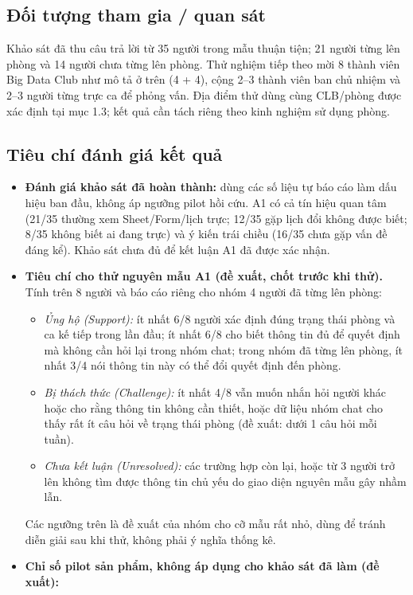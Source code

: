 \subsection{Đối tượng tham gia / quan sát}
Khảo sát đã thu câu trả lời từ 35 người trong mẫu thuận tiện; 21 người từng lên phòng và 14 người chưa từng lên phòng. Thử nghiệm tiếp theo mời 8 thành viên Big Data Club như mô tả ở trên (4 + 4), cộng 2--3 thành viên ban chủ nhiệm và 2--3 người từng trực ca để phỏng vấn. Địa điểm thử dùng cùng CLB/phòng được xác định tại mục 1.3; kết quả cần tách riêng theo kinh nghiệm sử dụng phòng.

\subsection{Tiêu chí đánh giá kết quả}
\begin{itemize}
    \item \textbf{Đánh giá khảo sát đã hoàn thành:} dùng các số liệu tự báo cáo làm dấu hiệu ban đầu, không áp ngưỡng pilot hồi cứu. A1 có cả tín hiệu quan tâm (21/35 thường xem Sheet/Form/lịch trực; 12/35 gặp lịch đổi không được biết; 8/35 không biết ai đang trực) và ý kiến trái chiều (16/35 chưa gặp vấn đề đáng kể). Khảo sát chưa đủ để kết luận A1 đã được xác nhận.
    \item \textbf{Tiêu chí cho thử nguyên mẫu A1 (đề xuất, chốt trước khi thử).} Tính trên 8 người và báo cáo riêng cho nhóm 4 người đã từng lên phòng:
    \begin{itemize}[nosep]
        \item \emph{Ủng hộ (Support):} ít nhất 6/8 người xác định đúng trạng thái phòng và ca kế tiếp trong lần đầu; ít nhất 6/8 cho biết thông tin đủ để quyết định mà không cần hỏi lại trong nhóm chat; trong nhóm đã từng lên phòng, ít nhất 3/4 nói thông tin này có thể đổi quyết định đến phòng.
        \item \emph{Bị thách thức (Challenge):} ít nhất 4/8 vẫn muốn nhắn hỏi người khác hoặc cho rằng thông tin không cần thiết, hoặc dữ liệu nhóm chat cho thấy rất ít câu hỏi về trạng thái phòng (đề xuất: dưới 1 câu hỏi mỗi tuần).
        \item \emph{Chưa kết luận (Unresolved):} các trường hợp còn lại, hoặc từ 3 người trở lên không tìm được thông tin chủ yếu do giao diện nguyên mẫu gây nhầm lẫn.
    \end{itemize}
    Các ngưỡng trên là đề xuất của nhóm cho cỡ mẫu rất nhỏ, dùng để tránh diễn giải sau khi thử, không phải ý nghĩa thống kê.
    \item \textbf{Chỉ số pilot sản phẩm, không áp dụng cho khảo sát đã làm (đề xuất):}

\end{itemize}
